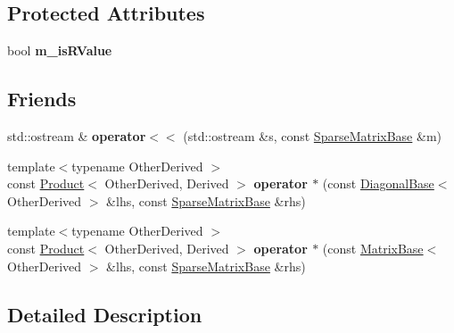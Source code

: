 \subsection*{Protected Attributes}
\begin{DoxyCompactItemize}
\item 
\mbox{\label{class_eigen_1_1_sparse_matrix_base_a3e18769c71fc666a57c10f475ea5ada6}} 
bool {\bfseries m\+\_\+is\+R\+Value}
\end{DoxyCompactItemize}
\subsection*{Friends}
\begin{DoxyCompactItemize}
\item 
\mbox{\label{class_eigen_1_1_sparse_matrix_base_a34261623108465eab7a7290ddee9d111}} 
std\+::ostream \& {\bfseries operator$<$$<$} (std\+::ostream \&s, const \mbox{\hyperlink{class_eigen_1_1_sparse_matrix_base}{Sparse\+Matrix\+Base}} \&m)
\item 
\mbox{\label{class_eigen_1_1_sparse_matrix_base_a6c17b050d9c3d96b6d99c0eace44e7a0}} 
{\footnotesize template$<$typename Other\+Derived $>$ }\\const \mbox{\hyperlink{class_eigen_1_1_product}{Product}}$<$ Other\+Derived, Derived $>$ {\bfseries operator $\ast$} (const \mbox{\hyperlink{class_eigen_1_1_diagonal_base}{Diagonal\+Base}}$<$ Other\+Derived $>$ \&lhs, const \mbox{\hyperlink{class_eigen_1_1_sparse_matrix_base}{Sparse\+Matrix\+Base}} \&rhs)
\item 
\mbox{\label{class_eigen_1_1_sparse_matrix_base_a9c2201f9a7e64c0b949dc8cb1cecbe27}} 
{\footnotesize template$<$typename Other\+Derived $>$ }\\const \mbox{\hyperlink{class_eigen_1_1_product}{Product}}$<$ Other\+Derived, Derived $>$ {\bfseries operator $\ast$} (const \mbox{\hyperlink{class_eigen_1_1_matrix_base}{Matrix\+Base}}$<$ Other\+Derived $>$ \&lhs, const \mbox{\hyperlink{class_eigen_1_1_sparse_matrix_base}{Sparse\+Matrix\+Base}} \&rhs)
\end{DoxyCompactItemize}


\subsection{Detailed Description}
